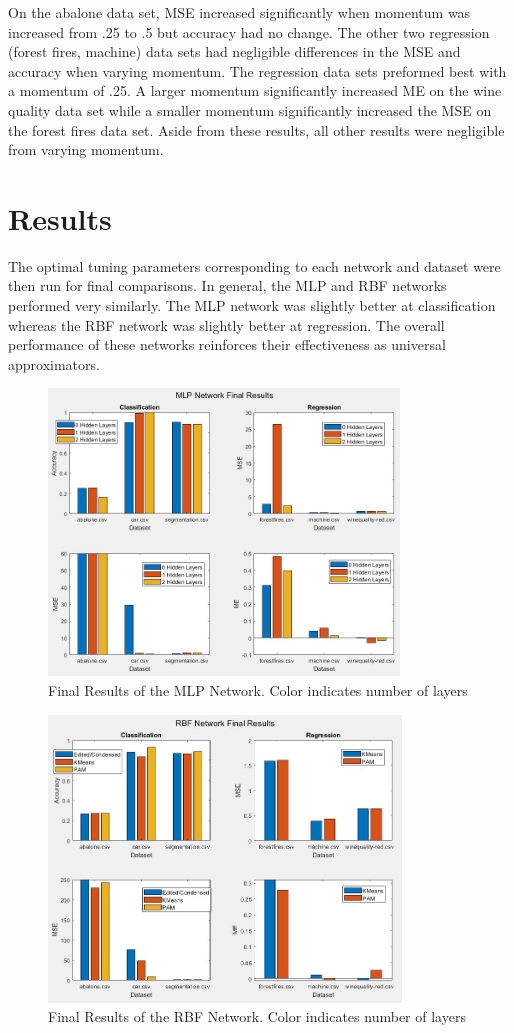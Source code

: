 \documentclass[twoside,11pt]{article}
\begin{document}
On the abalone data set, MSE increased significantly when momentum was increased from .25 to .5 but accuracy had no change. The other two regression (forest fires, machine) data sets had negligible differences in the MSE and accuracy when varying momentum. The regression data sets preformed best with a momentum of .25. A larger momentum significantly increased ME on the wine quality data set while a smaller momentum significantly increased the MSE on the forest fires data set. Aside from these results, all other results were negligible from varying momentum.
\section{Results}

	The optimal tuning parameters corresponding to each network and dataset were then run for final comparisons. In general, the MLP and RBF networks performed very similarly. The MLP network was slightly better at classification whereas the RBF network was slightly better at regression. The overall performance of these networks reinforces their effectiveness as universal approximators.

\begin{figure}[h]
	\centering
	\includegraphics[height=3in]{FINAL_FIGS/MLP_FINAL.JPG}
	\caption{Final Results of the MLP Network. Color indicates number of layers}
\end{figure}
\begin{figure}[h]
	\centering
	\includegraphics[height=3in]{FINAL_FIGS/RBF_FINAL.JPG}
	\caption{Final Results of the RBF Network. Color indicates number of layers}
\end{figure}
\end{document}
